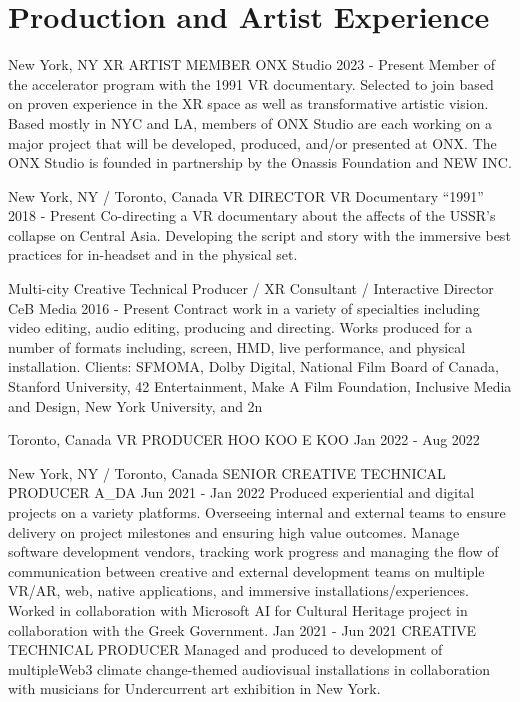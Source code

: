 \documentclass[11pt,a4paper,sans]{moderncv}   %
\begin{document}
\makecvtitle

\section{Production and Artist Experience}

\cventry
  {New York, NY}
  {XR ARTIST MEMBER}
  {ONX Studio}
  {2023 - Present}{}
  {Member of the accelerator program with the 1991 VR documentary. Selected to join based on proven experience in the XR space as well as transformative artistic vision. Based mostly in NYC and LA, members of ONX Studio are each working on a major project that will be developed, produced, and/or presented at ONX. The ONX Studio is founded in partnership by the Onassis Foundation and NEW INC.}

\cventry
  {New York, NY / Toronto, Canada}
  {VR DIRECTOR}
  {VR Documentary “1991”}
  {2018 - Present}{}
  {Co-directing a VR documentary about the affects of the USSR’s collapse on Central Asia. Developing the script and story with the immersive best practices for in-headset and in the physical set.
  }

\cventry
  {Multi-city}
  {Creative Technical Producer / XR Consultant / Interactive Director}
  {CeB Media}
  {2016 - Present}{}
  {Contract work in a variety of specialties including video editing,
  audio editing, producing and directing. Works produced for
  a number of formats including, screen, HMD, live performance,
  and physical installation. Clients: SFMOMA, Dolby Digital, National Film Board of Canada,
  Stanford University, 42 Entertainment, Make A Film Foundation,
  Inclusive Media and Design, New York University, and 2n}

\cventry
  {Toronto, Canada}
  {VR PRODUCER}
  {HOO KOO E KOO}
  {Jan 2022 - Aug 2022}{}
  {}

\cventry
  {New York, NY / Toronto, Canada}
  {SENIOR CREATIVE TECHNICAL PRODUCER}
  {A\_DA}
  {Jun 2021 - Jan 2022}{}
  {Produced experiential and digital projects on a variety platforms. Overseeing internal and external teams to ensure delivery on project milestones and ensuring high value outcomes. Manage software development vendors, tracking work progress and managing the flow of communication between creative and external development teams on multiple VR/AR, web, native applications, and immersive installations/experiences. Worked in collaboration with Microsoft AI for Cultural Heritage project in collaboration with the Greek Government.}
\cventry
  {Jan 2021 - Jun 2021}
  {CREATIVE TECHNICAL PRODUCER}
  {}
  {}{}
  {Managed and produced to development of multipleWeb3 climate change-themed audiovisual installations in collaboration with musicians for Undercurrent art exhibition in New York.}
\end{document}
